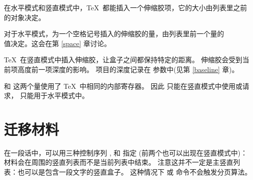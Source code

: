 \documentclass{book}
\begin{document}
在水平模式和竖直模式中，\TeX\ 都能插入一个伸缩胶项，它的大小由列表里之前的对象决定。

对于水平模式，为一个空格记号插入的伸缩胶的量，由列表里前一个量的 \\ 
 值决定。这会在第 \ref{space} 章讨论。

\TeX\ 在竖直模式中插入伸缩胶，让盒子之间都保持特定的距离。
伸缩胶会受到当前项高度前一项深度的影响。
项目的深度记录在  参数中(见第 \ref{baseline} 章)。

 和  这两个量使用了 \TeX\ 中相同的内部寄存器。
因此  只能在竖直模式中使用或请求， 只能用于水平模式中。

\section{迁移材料}
\label{migrate}

在一段话中，可以用三种控制序列 ,  和 指定 (前两个也可以出现在竖直模式中)：
材料会在周围的竖直列表而不是当前列表中结束。
注意这并不一定是主竖直列表：也可以是包含一段文字的竖直盒子。
这种情况下  或  命令不会触发分页算法。
\end{document}
